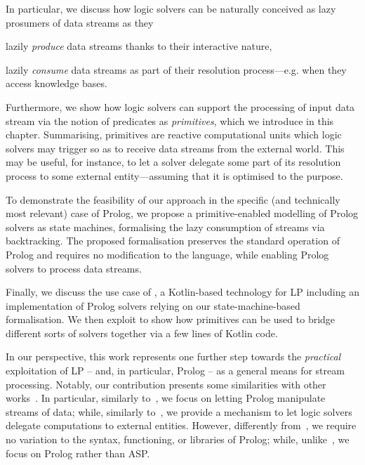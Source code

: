 \documentclass[12pt,a4paper,openright,twoside]{book}
\begin{document}
In particular, we discuss how logic solvers can be naturally conceived as lazy prosumers of data streams as they
%
\begin{inlinelist}
    \item lazily \emph{produce} data streams thanks to their interactive nature,
    \item lazily \emph{consume} data streams as part of their resolution process---e.g. when they access knowledge bases.
\end{inlinelist}
%
Furthermore, we show how logic solvers can support the processing of input data stream via the notion of predicates as \emph{primitives}, which we introduce in this chapter.
%
Summarising, primitives are reactive computational units which logic solvers may trigger so as to receive data streams from the external world.
%
This may be useful, for instance, to let a solver delegate some part of its resolution process to some external entity---assuming that it is optimised to the purpose.

To demonstrate the feasibility of our approach in the specific (and technically most relevant) case of Prolog, we propose a primitive-enabled modelling of Prolog solvers as state machines, formalising the lazy consumption of streams via backtracking.
%
The proposed formalisation preserves the standard operation of Prolog and requires no modification to the language, while enabling Prolog solvers to process data streams.

Finally, we discuss the use case of \twopkt{} \cite{homepage2PKt}, a Kotlin-based technology for LP including an implementation of Prolog solvers relying on our state-machine-based formalisation.
%
We then exploit \twopkt{} to show how primitives can be used to bridge different sorts of solvers together via a few lines of Kotlin code.

In our perspective, this work represents one further step towards the \emph{practical} exploitation of LP -- and, in particular, Prolog -- as a general means for stream processing.
%
Notably, our contribution presents some similarities with other works~\cite{Tarau2019,Redl16}.
%
In particular, similarly to~\cite{Tarau2019}, we focus on letting Prolog manipulate streams of data; while, similarly to~\cite{Redl16}, we provide a mechanism to let logic solvers delegate computations to external entities.
%
However, differently from~\cite{Tarau2019}, we require no variation to the syntax, functioning, or libraries of Prolog; while, unlike~\cite{Redl16}, we focus on Prolog rather than ASP.
\end{document}
